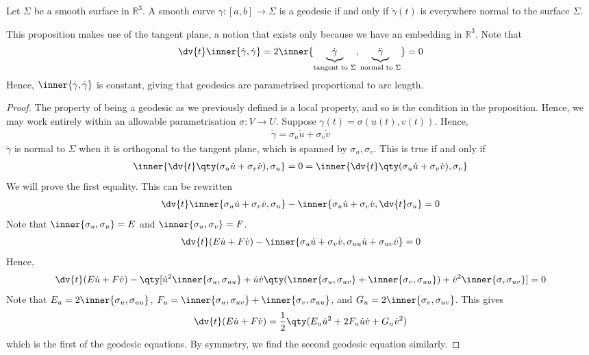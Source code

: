 \begin{proposition}
	Let $\Sigma$ be a smooth surface in $\mathbb R^3$.
	A smooth curve $\gamma \colon [a,b] \to \Sigma$ is a geodesic if and only if $\ddot \gamma(t)$ is everywhere normal to the surface $\Sigma$.
\end{proposition}
\begin{remark}
	This proposition makes use of the tangent plane, a notion that exists only because we have an embedding in $\mathbb R^3$.
	Note that
	\begin{align*}
		\dv{t} \inner{\dot \gamma, \dot \gamma} = 2 \inner{\underbrace{\dot \gamma}_{\text{tangent to } \Sigma}, \underbrace{\ddot \gamma}_{\text{normal to } \Sigma}} = 0
	\end{align*}
	Hence, $\inner{\dot \gamma, \dot \gamma}$ is constant, giving that geodesics are parametrised proportional to arc length.
\end{remark}
\begin{proof}
	The property of being a geodesic as we previously defined is a local property, and so is the condition in the proposition.
	Hence, we may work entirely within an allowable parametrisation $\sigma \colon V \to U$.
	Suppose $\gamma(t) = \sigma(u(t), v(t))$.
	Hence,
	\begin{align*}
		\dot \gamma = \sigma_u \dot u + \sigma_v \dot v
	\end{align*}
	$\ddot \gamma$ is normal to $\Sigma$ when it is orthogonal to the tangent plane, which is spanned by $\sigma_u, \sigma_v$.
	This is true if and only if
	\begin{align*}
		\inner{ \dv{t} \qty(\sigma_u \dot u + \sigma_v \dot v), \sigma_u } = 0 = \inner{ \dv{t} \qty(\sigma_u \dot u + \sigma_v \dot v), \sigma_v }
	\end{align*}
	We will prove the first equality.
	This can be rewritten
	\begin{align*}
		\dv{t} \inner{\sigma_u \dot u + \sigma_v \dot v, \sigma_u} - \inner{\sigma_u \dot u + \sigma_v \dot v, \dv{t} \sigma_u} = 0
	\end{align*}
	Note that $\inner{\sigma_u, \sigma_u} = E$ and $\inner{\sigma_u, \sigma_v} = F$.
	\begin{align*}
		\dv{t} (E \dot u + F \dot v) - \inner{\sigma_u \dot u + \sigma_v \dot v, \sigma_{uu} \dot u + \sigma_{uv} \dot v} = 0
	\end{align*}
	Hence,
	\begin{align*}
		\dv{t} (E \dot u + F \dot v) - \qty[ \dot u^2 \inner{\sigma_u, \sigma_{uu}} + \dot u \dot v \qty(\inner{\sigma_u, \sigma_{uv}} + \inner{\sigma_v, \sigma_{uu}}) + \dot v^2 \inner{\sigma_v \sigma_{uv}} ] = 0
	\end{align*}
	Note that $E_u = 2 \inner{\sigma_u, \sigma_{uu}}$, $F_u = \inner{\sigma_u, \sigma_{uv}} + \inner{\sigma_v, \sigma_{uu}}$, and $G_u = 2\inner{\sigma_v, \sigma_{uv}}$.
	This gives
	\begin{align*}
		\dv{t} (E \dot u + F \dot v) = \frac{1}{2} \qty(E_u \dot u^2 + 2 F_u \dot u \dot v + G_u \dot v^2)
	\end{align*}
	which is the first of the geodesic equations.
	By symmetry, we find the second geodesic equation similarly.
\end{proof}

